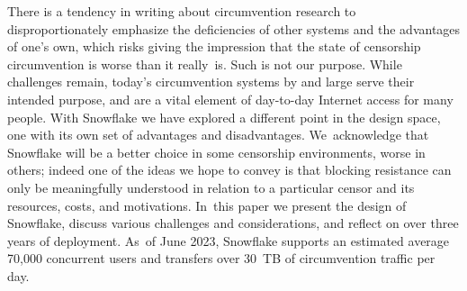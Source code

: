 \documentclass[letterpaper,twocolumn]{article}
\begin{document}
There is a tendency
in writing about circumvention research
to disproportionately emphasize the deficiencies
of other systems and the advantages of one's own,
which risks giving the impression that the state of censorship circumvention
is worse than it really~is.
Such is not our purpose.
While challenges remain,
today's circumvention systems by and large
serve their intended purpose,
and are a vital element of day-to-day Internet access for many people.
With Snowflake we have explored a different point in the design space,
one with its own set of advantages and disadvantages.
We~acknowledge that Snowflake will be a better choice in some
censorship environments,
worse in others;
indeed one of the ideas we hope to convey
is that blocking resistance
can only be meaningfully understood in relation to a particular censor
and its resources, costs, and motivations.
In~this paper we present the design of Snowflake,
discuss various challenges and considerations,
and reflect on over three years of deployment.
As~of June 2023, Snowflake supports an estimated average 70,000 concurrent users
and transfers over 30~TB of circumvention traffic per day.
\end{document}
